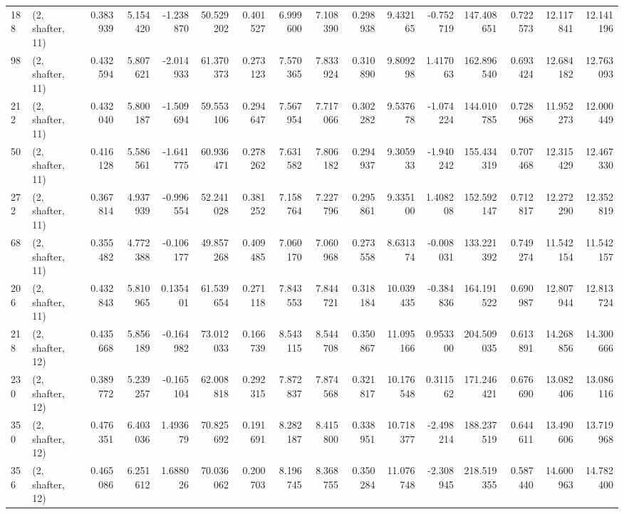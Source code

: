 \begin{tabular}{llrrrrrrrrrrrrrr}
188 &  (2, shafter, 11) &   0.383939 &   5.154420 &  -1.238870 &    50.529202 &   0.401527 &   6.999600 &   7.108390 &  0.298938 &   9.432165 &  -0.752719 &   147.408651 &  0.722573 &  12.117841 &  12.141196 \\
98  &  (2, shafter, 11) &   0.432594 &   5.807621 &  -2.014933 &    61.370373 &   0.273123 &   7.570365 &   7.833924 &  0.310890 &   9.809298 &   1.417063 &   162.896540 &  0.693424 &  12.684182 &  12.763093 \\
212 &  (2, shafter, 11) &   0.432040 &   5.800187 &  -1.509694 &    59.553106 &   0.294647 &   7.567954 &   7.717066 &  0.302282 &   9.537678 &  -1.074224 &   144.010785 &  0.728968 &  11.952273 &  12.000449 \\
50  &  (2, shafter, 11) &   0.416128 &   5.586561 &  -1.641775 &    60.936471 &   0.278262 &   7.631582 &   7.806182 &  0.294937 &   9.305933 &  -1.940242 &   155.434319 &  0.707468 &  12.315429 &  12.467330 \\
272 &  (2, shafter, 11) &   0.367814 &   4.937939 &  -0.996554 &    52.241028 &   0.381252 &   7.158764 &   7.227796 &  0.295861 &   9.335100 &   1.408208 &   152.592147 &  0.712817 &  12.272290 &  12.352819 \\
68  &  (2, shafter, 11) &   0.355482 &   4.772388 &  -0.106177 &    49.857268 &   0.409485 &   7.060170 &   7.060968 &  0.273558 &   8.631374 &  -0.008031 &   133.221392 &  0.749274 &  11.542154 &  11.542157 \\
206 &  (2, shafter, 11) &   0.432843 &   5.810965 &   0.135401 &    61.539654 &   0.271118 &   7.843553 &   7.844721 &  0.318184 &  10.039435 &  -0.384836 &   164.191522 &  0.690987 &  12.807944 &  12.813724 \\
218 &  (2, shafter, 12) &   0.435668 &   5.856189 &  -0.164982 &    73.012033 &   0.166739 &   8.543115 &   8.544708 &  0.350867 &  11.095166 &   0.953300 &   204.509035 &  0.613891 &  14.268856 &  14.300666 \\
230 &  (2, shafter, 12) &   0.389772 &   5.239257 &  -0.165104 &    62.008818 &   0.292315 &   7.872837 &   7.874568 &  0.321817 &  10.176548 &   0.311562 &   171.246421 &  0.676690 &  13.082406 &  13.086116 \\
350 &  (2, shafter, 12) &   0.476351 &   6.403036 &   1.493679 &    70.825692 &   0.191691 &   8.282187 &   8.415800 &  0.338951 &  10.718377 &  -2.498214 &   188.237519 &  0.644611 &  13.490606 &  13.719968 \\
356 &  (2, shafter, 12) &   0.465086 &   6.251612 &   1.688026 &    70.036062 &   0.200703 &   8.196745 &   8.368755 &  0.350284 &  11.076748 &  -2.308945 &   218.519355 &  0.587440 &  14.600963 &  14.782400 \\

\end{tabular}
